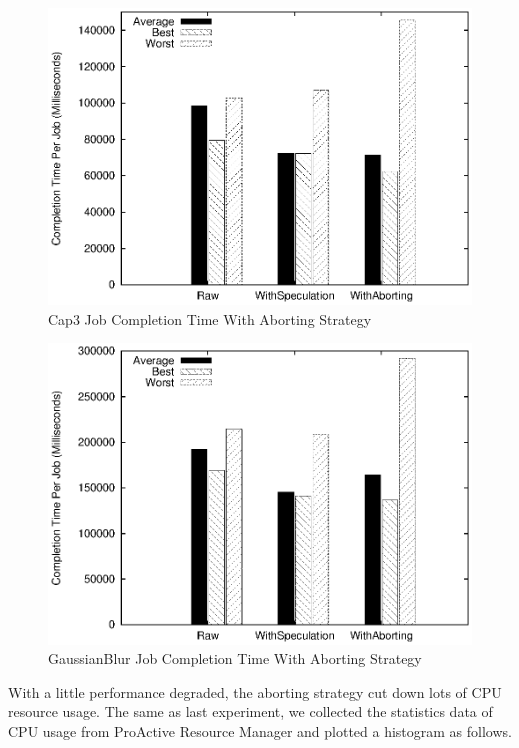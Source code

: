\begin{figure}
\centering
\includegraphics[width=0.9\columnwidth]{figures/abort_completiontime_cap3.eps}
\caption{Cap3 Job Completion Time With Aborting Strategy}
\label{figure:abort_completiontime_cap3}
\end{figure}

\begin{figure}
\centering
\includegraphics[width=0.9\columnwidth]{figures/abort_completiontime_gaussianblur.eps}
\caption{GaussianBlur Job Completion Time With Aborting Strategy}
\label{figure:abort_completiontime_gaussianblur}
\end{figure}

With a little performance degraded, the aborting strategy cut down lots of CPU resource usage. The same as last experiment, we collected the statistics data of CPU usage from ProActive Resource Manager and plotted a histogram as follows.

